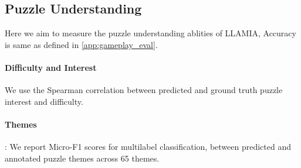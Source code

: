 \documentclass{article}
\theoremstyle{plain}
\theoremstyle{definition}
\theoremstyle{remark}
\begin{document}
\subsection{Puzzle Understanding}
Here we aim to measure the puzzle understanding ablities of LLAMIA, Accuracy is same as defined in \cref{app:gameplay_eval}. 

\paragraph{Difficulty and Interest} We use the Spearman correlation between predicted and ground truth puzzle interest and difficulty.

\paragraph{Themes}: We report Micro-F1 scores for multilabel classification, between predicted and annotated puzzle themes across 65 themes.
\end{document}
